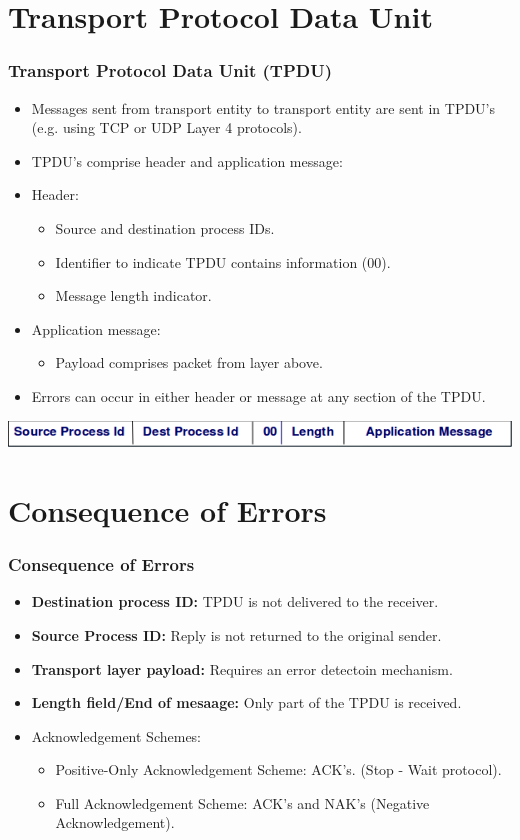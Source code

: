 \documentclass{beamer}
\begin{document}
\section{Transport Protocol Data Unit}
\begin{frame}
\frametitle{Transport Protocol Data Unit (TPDU)}
\begin{itemize}
\item Messages sent from transport entity to transport entity are sent in TPDU's (e.g. using TCP or UDP Layer 4 protocols).
\item TPDU's comprise header and application message:
\item Header:
\begin{itemize}
\item Source and destination process IDs.
\item Identifier to indicate TPDU contains information (00).
\item Message length indicator.
\end{itemize}
\item Application message:
\begin{itemize}
\item Payload comprises packet from layer above.
\end{itemize}
\item Errors can occur in either header or message at any section of the TPDU.
\end{itemize}
\includegraphics[scale=0.3]{tpdu.png}
\end{frame}
\section{Consequence of Errors}
\begin{frame}
\frametitle{Consequence of Errors}
\begin{itemize}
\item \textbf{Destination process ID:} TPDU is not delivered to the receiver.
\item \textbf{Source Process ID:} Reply is not returned to the original sender.
\item \textbf{Transport layer payload:} Requires an error detectoin mechanism.
\item \textbf{Length field/End of mesaage:} Only part of the TPDU is received.
\item Acknowledgement Schemes:
\begin{itemize}
\item Positive-Only Acknowledgement Scheme: ACK's. (Stop - Wait protocol).
\item Full Acknowledgement Scheme: ACK's and NAK's (Negative Acknowledgement).
\end{itemize}
\end{itemize}
\end{frame}
\end{document}
